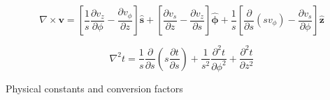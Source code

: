 \documentclass[11pt]{article}
\begin{document}
\[
\nabla \times \mathbf { v } = \left[ \frac { 1 } { s } \frac { \partial v _ { z } } { \partial \phi } - \frac { \partial v _ { \phi } } { \partial z } \right] \hat { \mathbf { s } } + \left[ \frac { \partial v _ { s } } { \partial z } - \frac { \partial v _ { z } } { \partial s } \right] \hat { \boldsymbol { \phi } } + \frac { 1 } { s } \left[ \frac { \partial } { \partial s } \left( s v _ { \phi } \right) - \frac { \partial v _ { s } } { \partial \phi } \right] \hat { \mathbf { z } }
\]


\[
\nabla ^ { 2 } t = \frac { 1 } { s } \frac { \partial } { \partial s } \left( s \frac { \partial t } { \partial s } \right) + \frac { 1 } { s ^ { 2 } } \frac { \partial ^ { 2 } t } { \partial \phi ^ { 2 } } + \frac { \partial ^ { 2 } t } { \partial z ^ { 2 } }
\]


\pagebreak


{\large \centerline{Physical constants and conversion factors}}
\def\npar{\par\medskip}
\def\vvec#1{\vec{#1}\,}
\def\rr{\vec{r}}
\def\vv{\vec{v}}
\def\aaa{\vec{a}}
\def\e#1{\vec{e}_{\rm #1}}
\def\ee#1{\vec{e}_{#1}}
\def\Q#1#2{\frac{\partial #1}{\partial #2}}
\def\QQ#1#2{\frac{\partial^2 #1}{\partial #2^2}}
\def\Qc#1#2#3{\left(\frac{\partial #1}{\partial #2}\right)_{#3}}
\def\LL{{\cal L}}
\def\RR{I\hspace{-1mm}R}
\def\NN{I\hspace{-1mm}N}
\def\TT{\mbox{\sfd T}}
\def\DD{\mbox{\sfd D}}
\def\half{\mbox{$\frac{1}{2}$}}
\def\kwart{\mbox{$\frac{1}{4}$}}
\def\av#1{\left\langle #1 \right\rangle}
\def\oiint{\int\hspace{-2ex}\int\hspace{-3ex}\bigcirc~}
\def\iint{\int\hspace{-1.5ex}\int}
\def\iiint{\int\hspace{-1.5ex}\int\hspace{-1.5ex}\int}
\def\dd{d\hspace{-1ex}\rule[1.25ex]{2mm}{0.4pt}}
\def\lrarrow{~\lower.2ex\hbox{$\rightarrow$}\kern-2.4ex\raise.7ex\hbox{$\leftarrow$}~}
\def\rlarrow{~\lower.2ex\hbox{$\leftarrow$}\kern-2.3ex\raise.7ex\hbox{$\rightarrow$}~}
\def\ne{n_{\rm e}}
\def\ni{n_{\rm i}}
\def\no{n_{\rm 0}}
\def\me{m_{\rm e}}
\def\mi{m_{\rm i}}
\def\Te{T_{\rm e}}
\def\Ti{T_{\rm i}}
\end{document}
